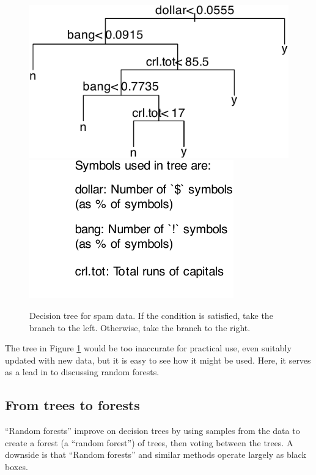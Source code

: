 \documentclass[
  10pt,
  b5paper]{book}
\begin{document}
\begin{figure}[H]

{\centering \includegraphics[width=0.48\linewidth]{08-observational_files/figure-latex/spam-1} \includegraphics[width=0.48\linewidth]{08-observational_files/figure-latex/spam-2} 

}

\caption{Decision tree for spam data. If the condition is satisfied, take
               the branch to the left.  Otherwise, take the branch to the right.}\label{fig:spam}
\end{figure}

The tree in Figure \ref{fig:spam} would be too inaccurate
for practical use, even suitably updated with new data,
but it is easy to see how it might be used. Here, it serves
as a lead in to discussing random forests.

\hypertarget{from-trees-to-forests}{%
\subsection*{From trees to forests}\label{from-trees-to-forests}}

``Random forests'' improve on decision trees by using samples from
the data to create a forest (a ``random forest'') of trees, then
voting between the trees. A downside is that ``Random forests''
and similar methods operate largely as black boxes.
\end{document}
